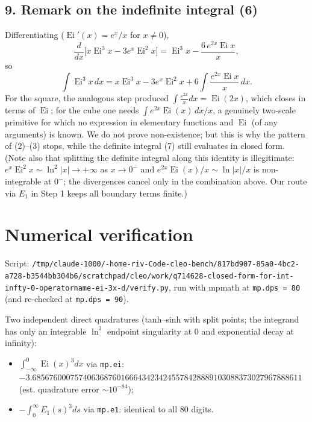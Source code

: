 \documentclass[11pt]{article}
\theoremstyle{remark}
\begin{document}
\subsection*{9. Remark on the indefinite integral (6)}

Differentiating ($\operatorname{Ei}'(x)=e^{x}/x$ for $x\neq0$),
$$\frac{d}{dx}\Big[x\operatorname{Ei}^{3}x-3e^{x}\operatorname{Ei}^{2}x\Big]
=\operatorname{Ei}^{3}x-\frac{6\,e^{2x}\operatorname{Ei}x}{x},$$
so
$$\int\operatorname{Ei}^{3}x\,dx=x\operatorname{Ei}^{3}x-3e^{x}\operatorname{Ei}^{2}x+6\int\frac{e^{2x}\operatorname{Ei}x}{x}\,dx .$$
For the square, the analogous step produced $\int\frac{e^{2x}}{x}dx=\operatorname{Ei}(2x)$, which closes in terms of $\operatorname{Ei}$; for the cube one needs $\int e^{2x}\operatorname{Ei}(x)\,dx/x$, a genuinely two-scale primitive for which no expression in elementary functions and $\operatorname{Ei}$ (of any arguments) is known. We do not prove non-existence; but this is why the pattern of (2)--(3) stops, while the definite integral (7) still evaluates in closed form. (Note also that splitting the definite integral along this identity is illegitimate: $e^{x}\operatorname{Ei}^{2}x\sim\ln^{2}|x|\to+\infty$ as $x\to0^{-}$ and $e^{2x}\operatorname{Ei}(x)/x\sim\ln|x|/x$ is non-integrable at $0^-$; the divergences cancel only in the combination above. Our route via $E_1$ in Step 1 keeps all boundary terms finite.)

\section*{Numerical verification}

Script: \nolinkurl{/tmp/claude-1000/-home-riv-Code-cleo-bench/817bd907-85a0-4bc2-a728-b3544bb304b6/scratchpad/cleo/work/q714628-closed-form-for-int-infty-0-operatorname-ei-3x-d/verify.py}, run with mpmath at \texttt{mp.dps = 80} (and re-checked at \texttt{mp.dps = 90}).

Two independent direct quadratures (tanh--sinh with split points; the integrand has only an integrable $\ln^3$ endpoint singularity at $0$ and exponential decay at infinity):

\begin{itemize}
\item $\displaystyle\int_{-\infty}^{0}\operatorname{Ei}(x)^{3}dx$ via \texttt{mp.ei}:\\
 {\footnotesize$-3.6856760007574063687601666434234245578428889103088373027967888611$}\\ (est. quadrature error $\sim10^{-84}$);
\item $-\displaystyle\int_{0}^{\infty}E_1(s)^{3}ds$ via \texttt{mp.e1}: identical to all 80 digits.
\end{itemize}
\end{document}
